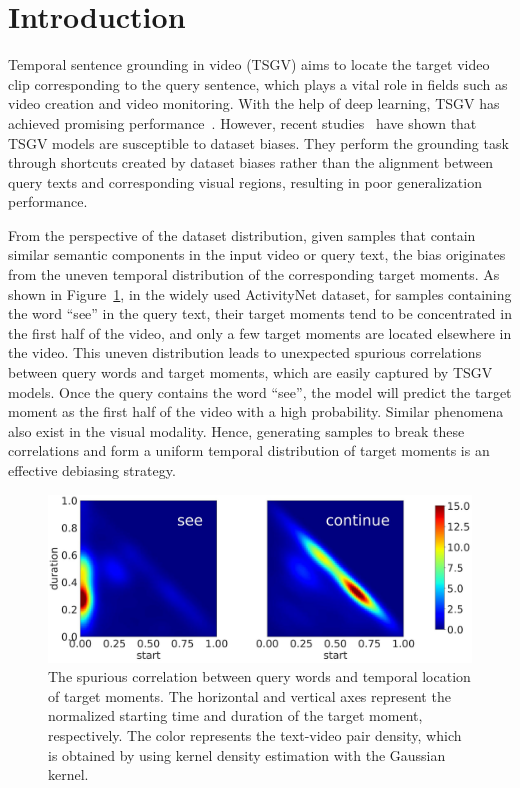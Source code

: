 \section{Introduction}
\label{sec:intro}


Temporal sentence grounding in video (TSGV) aims to locate the target video clip corresponding to the query sentence, which plays a vital role in fields such as video creation and video monitoring. 
With the help of deep learning, TSGV has achieved promising performance~\cite{RN2, RN3, RN4, RN5, zheng2023generating, wang2023scene}. 
However, recent studies~\cite{RN7, RN28, RN29} have shown that TSGV models are susceptible to dataset biases. 
They perform the grounding task through shortcuts created by dataset biases rather than the alignment between query texts and corresponding visual regions, resulting in poor generalization performance.

From the perspective of the dataset distribution, 
given samples that contain similar semantic components in the input video or query text, the bias originates from the uneven temporal distribution of the corresponding target moments. 
As shown in Figure~\ref{Introduction}, in the widely used ActivityNet dataset, for samples containing the word ``see'' in the query text, their target moments tend to be concentrated in the first half of the video, and only a few target moments are located elsewhere in the video. This uneven distribution leads to unexpected spurious correlations between query words and target moments, which are easily captured by TSGV models. Once the query contains the word ``see'', the model will predict the target moment as the first half of the video with a high probability. 
Similar phenomena also exist in the visual modality. 
Hence, generating samples to break these correlations and form a uniform temporal distribution of target moments is an effective debiasing strategy. 


\begin{figure}[t]
	\centering
	\includegraphics[width=\linewidth]{images/Introduction.jpg}%
	\caption{The spurious correlation between query words and temporal location of target moments. The horizontal and vertical axes represent the normalized starting time and duration of the target moment, respectively. The color represents the text-video pair density, which is obtained by using kernel density estimation with the Gaussian kernel.}
	\label{Introduction}
\end{figure}


